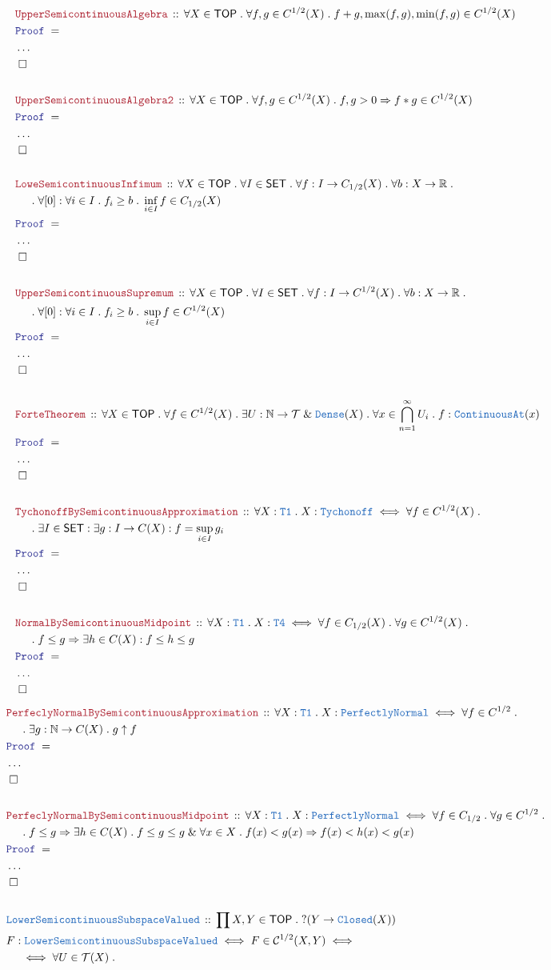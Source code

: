 \documentclass[12pt]{scrartcl}
\newcommand{\TYPE}[1]{\textcolor{NavyBlue}{\mathtt{#1}}}
\newcommand{\LOGIC}[1]{\textcolor{Blue}{\mathtt{#1}}}
\newcommand{\THM}[1]{\textcolor{Maroon}{\mathtt{#1}}}
\renewcommand{\.}{\; . \;}
\newcommand{\Theorem}[2]{& \THM{#1} \, :: \, #2 \\ & \Proof = \\ }
\newcommand{\DeclareType}[2]{& \TYPE{#1} \, :: \, #2 \\}
\newcommand{\DefineNamedType}[4]{& #1 : \TYPE{#2} \iff #3 \iff #4 \\}
\newcommand{\NewLine}{\\ & \kern 1pc}
\newcommand{\Page}[1]{ \begin{align*} #1 \end{align*}   }
\newcommand{\NoProof}{ & \ldots \\ \EndProof}
\renewcommand{\And}{\; \& \;}
\newcommand{\Imply}{\Rightarrow}
\newcommand{\Reals}{\mathbb{R} }
\newcommand{\Nat}{\mathbb{N} }
\newcommand{\QED}{\; \square}
\newcommand{\EndProof}{& \QED \\}
\newcommand{\Proof}{\LOGIC{Proof} \; }
\renewcommand{\C}{\mathcal{C}}
\newcommand{\SET}{\mathsf{SET}}
\newcommand{\PN}{\TYPE{PerfectlyNormal}}
\newcommand{\TOP}{\mathsf{TOP}}
\newcommand{\T}{\mathcal{T}}
\begin{document}
\Page{
	\Theorem{UpperSemicontinuousAlgebra}
	{
		\forall X \in \TOP \.
		\forall f,g \in C^{1/2}(X) \.
		f + g, \max(f,g), \min(f,g) \in C^{1/2}(X)
	}
	\NoProof
	\\
	\Theorem{UpperSemicontinuousAlgebra2}
	{
		\forall X \in \TOP \.
		\forall f,g \in C^{1/2}(X) \. f,g > 0 \Imply
		f * g \in C^{1/2}(X)
	}
	\NoProof
	\\
	\Theorem{LoweSemicontinuousInfimum}
	{
		\forall X \in \TOP \. 
		\forall I \in \SET \.
		\forall f : I \to C_{1/2}(X) \.
		\forall b : X \to \Reals \. \NewLine \.  
		\forall [0] : \forall i \in I \. f_i \ge b \. 
		\inf_{i \in I} f \in C_{1/2}(X)
	}
	\NoProof
	\\
	\Theorem{UpperSemicontinuousSupremum}
	{
		\forall X \in \TOP \. 
		\forall I \in \SET \.
		\forall f : I \to C^{1/2}(X) \.
		\forall b : X \to \Reals \. \NewLine \.  
		\forall [0] : \forall i \in I \. f_i \ge b \. 
		\sup_{i \in I} f \in C^{1/2}(X)
	}
	\NoProof
	\\
	\Theorem{ForteTheorem}
	{
		\forall X \in \TOP \.
		\forall f \in C^{1/2}(X) \. 
		\exists U : \Nat \to \T \And \TYPE{Dense}(X) \.
		\forall x \in \bigcap^\infty_{n=1} U_i \.
		f : \TYPE{ContinuousAt}(x)
	}
	\NoProof
	\\
	\Theorem{TychonoffBySemicontinuousApproximation}
	{
		\forall X : \TYPE{T1} \.
		X : \TYPE{Tychonoff} \iff
		\forall f \in C^{1/2}(X) \. \NewLine \. 
		\exists I \in \SET :
		\exists g : I \to C(X) :
		f = \sup_{i \in I} g_i
	}
	\NoProof
	\\
	\Theorem{NormalBySemicontinuousMidpoint}
	{
		\forall X : \TYPE{T1} \.
		X : \TYPE{T4} \iff
		\forall f \in C_{1/2}(X) \.
		\forall g \in C^{1/2}(X) \. 
		\NewLine \.
		f \le g \Imply
		\exists h \in  C(X) :
		f \le h \le g 
	}
	\NoProof
}\Page{
	\Theorem{PerfeclyNormalBySemicontinuousApproximation}
	{
		\forall X : \TYPE{T1} \.
		X : \PN \iff
		\forall f \in C^{1/2} \. \NewLine \.
		\exists g : \Nat \to C(X) \. 
		g \uparrow f
	}
	\NoProof
	\\
	\Theorem{PerfeclyNormalBySemicontinuousMidpoint}
	{
		\forall X : \TYPE{T1} \.
		X : \PN \iff
		\forall f \in C_{1/2} \.
		\forall g \in C^{1/2} \. \NewLine \. 
		f \le g \Imply
		\exists h \in  C(X) \. 
		f \le g \le g \And 
		\forall x \in X \. f(x) < g(x) \Imply f(x) < h(x) < g(x) 
	}
	\NoProof
	\\
	\DeclareType{LowerSemicontinuousSubspaceValued}
	{
		\prod X,Y \in \TOP \.
		?( Y \to \TYPE{Closed}(X) )
	}
	\DefineNamedType{F}{LowerSemicontinuousSubspaceValued}{F \in \C^{1/2}(X,Y)}
	{
		\NewLine \iff
		\forall U \in \T(X) \.
}}
\end{document}
